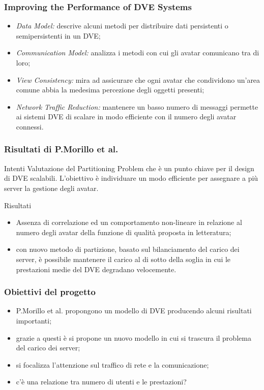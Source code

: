 \begin{frame}
\frametitle{Improving the Performance of DVE Systems}
\begin{itemize}[<+->]
\item
\emph{Data Model:} descrive alcuni metodi per distribuire dati persistenti o
semipersistenti in un DVE;
\item
\emph{Communication Model:} analizza i metodi con cui gli avatar comunicano
tra di loro;
\item
\emph{View Consistency:} mira ad assicurare che ogni avatar che condividono
un'area comune abbia la medesima percezione degli oggetti presenti;
\item
\emph{Network Traffic Reduction:} mantenere un basso numero di messaggi
permette ai sistemi DVE di scalare in modo efficiente con il numero
degli avatar connessi.
\end{itemize}
\end{frame}

\begin{frame}
\frametitle{Risultati di P.Morillo et al.}
\begin{block}{Intenti}
Valutazione del \alert{Partitioning Problem} che è un punto chiave per il
design di DVE scalabili. L'obiettivo è individuare un modo efficiente per
assegnare a più server la gestione degli avatar.
\end{block}
\pause
\begin{block}{Risultati}
\begin{itemize}
\item
Assenza di correlazione ed un comportamento non-lineare in relazione
al numero degli avatar della \alert{funzione di qualità} proposta in
letteratura;
\item
con nuovo metodo di partizione, basato sul bilanciamento del carico dei server,
è possibile mantenere il carico al di sotto della soglia in cui
le prestazioni medie del DVE degradano velocemente.
\end{itemize}
\end{block}
\end{frame}

\begin{frame}
\frametitle{Obiettivi del progetto}
\begin{itemize}%
\item
P.Morillo et al. propongono un modello di DVE producendo alcuni risultati
importanti;
\item
grazie a questi è si propone un nuovo modello in cui si trascura il problema
del carico dei server;
\item
si focalizza l'attenzione sul traffico di rete e la comunicazione;
\item
c'è una relazione tra numero di utenti e le prestazioni?
\end{itemize}
\end{frame}
